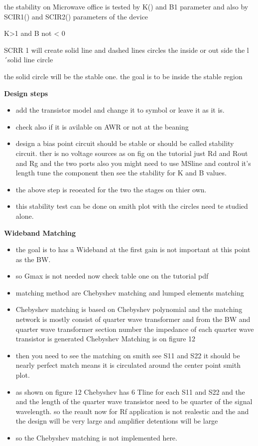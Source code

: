 \documentclass{article}
\begin{document}
the stability on Microwave office is tested by K() and B1 parameter and also by SCIR1() and SCIR2() parameters of the device

K>1 and B not < 0 

SCRR 1 will create solid line  and dashed lines circles the inside or out side the l´solid line circle 

the  solid circle will be the stable one. the goal is to be inside the stable region 

\textbf{ Design steps}
\begin{itemize}
    \item add the transistor model and change it to symbol or leave it as it is.
    \item check also if it is avilable on AWR or not at the beaning
    \item design a bias point circuit should be stable or should be called stability circuit. ther is no voltage sources as on fig on the tutorial just Rd and Rout and Rg and the two ports also you  might need to use MSline and control it's length tune the component then see the stability for K and B values.
    \item the above  step is  reoeated for the two the stages on thier own.
    \item this stability test can be done on smith plot with the circles need te studied alone.
\end{itemize}

\textbf{Wideband Matching}
\begin{itemize}
    \item the goal is to has a Wideband at the first gain is not important at this point as the BW.
    \item so Gmax is not needed now check table one on the tutorial pdf
    \item matching method are Chebyshev matching  and lumped elements matching
    \item Chebyshev matching is based on Chebyshev polynomial and the matching network is mostly consist of quarter wave transformer
    and from the BW and quarter wave transformer section number the impedance of each quarter wave transistor is generated
    Chebyshev Matching is on figure 12
    \item  then you need to see the matching on smith see S11 and S22 it should be nearly perfect match 
    means it is circulated around the center point smith plot.
    \item  as shown on figure 12 Chebyshev has 6 Tline for each S11 and S22 and the and the length of the quarter wave transistor
    need to be quarter of the signal wavelength. so the reault now for Rf application is not realestic and the
    and the design will be very large and amplifier detentions will be large
    \item so the Chebyshev matching is not implemented  here.
\end{itemize}
\end{document}
